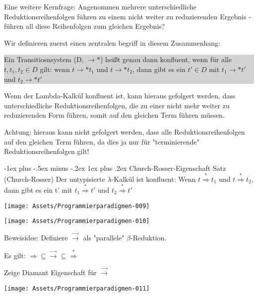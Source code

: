 \documentclass[10pt]{article}
\makeatletter
\renewcommand{\subsubsection}{\@startsection{subsubsection}{3}{0mm}%
                                {-1ex plus -.5ex minus -.2ex}%
                                {1ex plus .2ex}%
                                {\normalfont\small\bfseries}}
\makeatother
\begin{document}
\begin{itemize*}
\begin{itemize*}
\begin{itemize*}
  \end{itemize*}
  \item Eine weitere Kernfrage: Angenommen mehrere unterschiedliche Reduktionsreihenfolgen führen zu einem nicht weiter zu reduzierenden Ergebnis - \color{blue} führen all diese Reihenfolgen zum gleichen Ergebnis? \color{black}
  \item Wir definieren zuerst einen zentralen begriff in diesem Zusammenhang:
  \colorbox{lightgray}{\begin{minipage}[h]{1.0\linewidth}
      Ein Transitiosnsystem (D, $\rightarrow*$) heißt genau dann konfluent, wenn für alle $t,t_1,t_2 \in D$ gilt: wenn  $ t \rightarrow* t_1$ und $t \rightarrow* t_2$, dann gibt es ein $t' \in D$ mit $t_1 \rightarrow* t'$  		und $t_2 \rightarrow* t'$
    \end{minipage}}
  \item Wenn der Lambda-Kalkül konfluent ist, kann hieraus gefolgert werden, dass unterschiedliche Reduktionsreihenfolgen, die zu einer nicht mehr weiter zu reduzierenden Form führen, somit auf den gleichen Term führen müssen.
  \item Achtung: hieraus kann nicht gefolgert werden, dass alle Reduktionsreihenfolgen auf den gleichen Term führen, da dies ja nur für "terminierende" Reduktionsreihenfolgen gilt!
\end{itemize*}
\subsubsection{Church-Rosser-Eigenschaft}
\color{blue} Satz (Church-Rosser) \newline Der untypisierte $\lambda$-Kalkül ist konfluent: Wenn $t \stackrel{*}{\Rightarrow} t_1$ und $t \stackrel{*}{\Rightarrow} t_2$, dann gibt es ein t' mit $t_1 \stackrel{*}{\Rightarrow} t'$ und $t_2 \stackrel{*}{\Rightarrow} t'$

\begin{center}
  \texttt{[image: Assets/Programmierparadigmen-009]}
\end{center}
\begin{center}
  \texttt{[image: Assets/Programmierparadigmen-010]}
\end{center}
\color{black}
Beweisidee: Definiere $\stackrel{\rightarrow}{\rightarrow}$ als "parallele" $\beta$-Reduktion.
\begin{itemize*}
  \item Es gilt: $\Rightarrow \subseteq \stackrel{\rightarrow}{\rightarrow} \subseteq \stackrel{*}{\Rightarrow}$
  \item Zeige Diamant Eigenschaft für $\stackrel{\rightarrow}{\rightarrow}$
\end{itemize*}
\begin{center}
  \texttt{[image: Assets/Programmierparadigmen-011]}
  

\end{center}
\end{itemize*}
\end{document}
